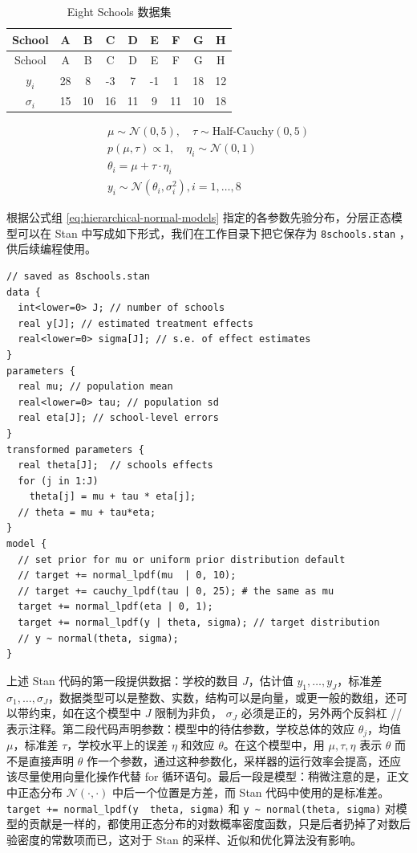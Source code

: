 \documentclass[12pt,a4paper,UTF8,twoside]{book}
\theoremstyle{definition}
\theoremstyle{definition}
\theoremstyle{definition}
\theoremstyle{remark}
\begin{document}
\begin{longtable}[]{@{}ccccccccc@{}}
\caption{\label{tab:eight-high-schools} Eight Schools 数据集}\tabularnewline
\toprule
School & A & B & C & D & E & F & G & H\tabularnewline
\midrule
\endfirsthead
\toprule
School & A & B & C & D & E & F & G & H\tabularnewline
\midrule
\endhead
\(y_i\) & 28 & 8 & -3 & 7 & -1 & 1 & 18 & 12\tabularnewline
\(\sigma_i\) & 15 & 10 & 16 & 11 & 9 & 11 & 10 & 18\tabularnewline
\bottomrule
\end{longtable}

\begin{equation}
\begin{aligned}
    \mu \sim \mathcal{N}(0,5), \quad \tau \sim \text{Half-Cauchy}(0,5) \\
    p(\mu,\tau) \propto 1, \quad \eta_i \sim \mathcal{N}(0,1) \\
    \theta_i  =   \mu + \tau \cdot \eta_i \\
    y_i \sim \mathcal{N}(\theta_i,\sigma^2_{i}), i = 1,\ldots,8
\end{aligned}
\label{eq:hierarchical-normal-models}
\end{equation}

根据公式组 \eqref{eq:hierarchical-normal-models}
指定的各参数先验分布，分层正态模型可以在 Stan
中写成如下形式，我们在工作目录下把它保存为 \texttt{8schools.stan}
，供后续编程使用。

\begin{verbatim}
// saved as 8schools.stan
data {
  int<lower=0> J; // number of schools 
  real y[J]; // estimated treatment effects
  real<lower=0> sigma[J]; // s.e. of effect estimates 
}
parameters {
  real mu; // population mean
  real<lower=0> tau; // population sd
  real eta[J]; // school-level errors
}
transformed parameters {
  real theta[J];  // schools effects
  for (j in 1:J)
    theta[j] = mu + tau * eta[j];
  // theta = mu + tau*eta;
}
model {
  // set prior for mu or uniform prior distribution default
  // target += normal_lpdf(mu  | 0, 10); 
  // target += cauchy_lpdf(tau | 0, 25); # the same as mu
  target += normal_lpdf(eta | 0, 1);
  target += normal_lpdf(y | theta, sigma); // target distribution
  // y ~ normal(theta, sigma);
}
\end{verbatim}

上述 Stan 代码的第一段提供数据：学校的数目 \(J\)，估计值
\(y_1,\ldots,y_{J}\)，标准差
\(\sigma_1,\ldots,\sigma_{J}\)，数据类型可以是整数、实数，结构可以是向量，或更一般的数组，还可以带约束，如在这个模型中
\(J\) 限制为非负， \(\sigma_{J}\) 必须是正的，另外两个反斜杠 //
表示注释。第二段代码声明参数：模型中的待估参数，学校总体的效应
\(\theta_j\)，均值 \(\mu\)，标准差 \(\tau\)，学校水平上的误差 \(\eta\)
和效应 \(\theta\)。在这个模型中，用 \(\mu,\tau,\eta\) 表示 \(\theta\)
而不是直接声明 \(\theta\)
作一个参数，通过这种参数化，采样器的运行效率会提高，还应该尽量使用向量化操作代替
for 循环语句。最后一段是模型：稍微注意的是，正文中正态分布
\(\mathcal{N}(\cdot,\cdot)\) 中后一个位置是方差，而 Stan
代码中使用的是标准差。\texttt{target\ +=\ normal\_lpdf(y\ \textbar{}\ theta,\ sigma)}
和 \texttt{y\ \textasciitilde{}\ normal(theta,\ sigma)}
对模型的贡献是一样的，都使用正态分布的对数概率密度函数，只是后者扔掉了对数后验密度的常数项而已，这对于
Stan 的采样、近似和优化算法没有影响。
\end{document}
